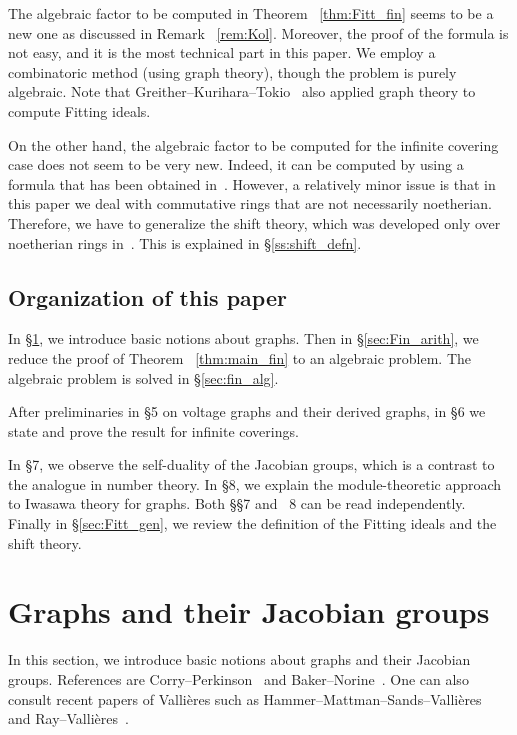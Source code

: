 \documentclass[11pt]{article}
\theoremstyle{definition}
\numberwithin{equation}{section}
\begin{document}
The algebraic factor to be computed in Theorem ~\ref{thm:Fitt_fin} seems to be a new one as discussed in Remark ~\ref{rem:Kol}.
Moreover, the proof of the formula is not easy, and it is the most technical part in this paper.
We employ a combinatoric method (using graph theory), though the problem is purely algebraic.
Note that Greither--Kurihara--Tokio~\cite{GKT20} also applied graph theory to compute Fitting ideals.

On the other hand, the algebraic factor to be computed for the infinite covering case does not seem to be very new.
Indeed, it can be computed by using a formula that has been obtained in~\cite{AK21}.
However, a relatively minor issue is that in this paper we deal with commutative rings that are not necessarily noetherian.
Therefore, we have to generalize the shift theory, which was developed only over noetherian rings in~\cite{Kata_05}.
This is explained in \S\ref{ss:shift_defn}.

\subsection{Organization of this paper}\label{ss:org}

In \S\ref{sec:defn_J_graph}, we introduce basic notions about graphs.
Then in \S\ref{sec:Fin_arith}, we reduce the proof of Theorem ~\ref{thm:main_fin} to an algebraic problem.
The algebraic problem is solved in \S\ref{sec:fin_alg}.

After preliminaries in \S5 on voltage graphs and their derived graphs, in \S6 we state and prove the result for infinite coverings.

In \S7, we observe the self-duality of the Jacobian groups, which is a contrast to the analogue in number theory.
In \S8, we explain the module-theoretic approach to Iwasawa theory for graphs.
Both \S\S7 and ~8 can be read independently.
Finally in \S\ref{sec:Fitt_gen}, we review the definition of the Fitting ideals and the shift theory.

\section{Graphs and their Jacobian groups}\label{sec:defn_J_graph}

In this section, we introduce basic notions about graphs and their Jacobian groups.
References are Corry--Perkinson~\cite[Chapters 1 and 2]{CP18} and Baker--Norine~\cite[\S 1.3]{BN07}.
One can also consult recent papers of Valli\`eres such as Hammer--Mattman--Sands--Valli\`eres~\cite[\S 2]{HMSV24} and Ray--Valli\`eres~\cite[\S 2]{RV22}.
\end{document}
